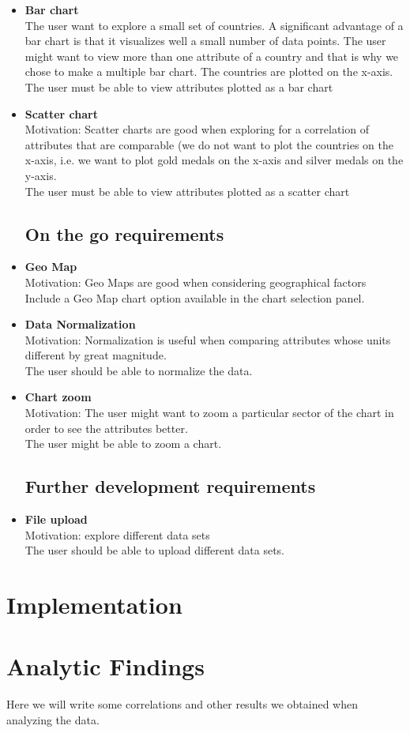 \documentclass[a4paper]{article}
\begin{document}
\begin{itemize}
\item{\textbf{Bar chart}\\The user want to explore a small set of countries. A significant advantage of a bar chart is that it visualizes well a small number of data points. The user might want to view more than one attribute of a country and that is why we chose to make a multiple bar chart. The countries are plotted on the x-axis.\\The user must be able to view attributes plotted as a bar chart}
\item{\textbf{Scatter chart}\\Motivation: Scatter charts are good when exploring for a correlation of attributes that are comparable (we do not want to plot the countries on the x-axis, i.e. we want to plot gold medals on the x-axis and silver medals on the y-axis.\\The user must be able to view attributes plotted as a scatter chart}

\subsection{On the go requirements}
\item{\textbf{Geo Map}\\Motivation: Geo Maps are good when considering geographical factors\\Include a Geo Map chart option available in the chart selection panel.}
\item{\textbf{Data Normalization}\\Motivation: Normalization is useful when comparing attributes whose units different by great magnitude.\\The user should be able to normalize the data.}
\item{\textbf{Chart zoom}\\Motivation: The user might want to zoom a particular sector of the chart in order to see the attributes better.\\The user might be able to zoom a chart.}

\subsection{Further development requirements}
\item{\textbf{File upload}\\Motivation: explore different data sets\\The user should be able to upload different data sets.}

\end{itemize}



\section{Implementation}



\section{Analytic Findings}
Here we will write some correlations and other results we obtained when analyzing the data.
\end{document}
